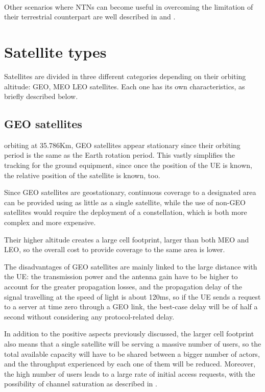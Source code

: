 \paragraph{} Other scenarios where \ac{NTNs} can become useful in overcoming the limitation of their terrestrial counterpart are well described in \cite{ntn-6g-era-challenges-giordani} and \cite{potential-multilayered-nierarchical-ntn-wang}.

\section{Satellite types}
Satellites are divided in three different categories depending on their orbiting altitude: \ac{GEO}, \ac{MEO} \ac{LEO} satellites. Each one has its own characteristics, as briefly described below.
\subsection{\ac{GEO} satellites}
orbiting at 35.786Km, \ac{GEO} satellites appear stationary since their orbiting period is the same as the Earth rotation period. This vastly simplifies the tracking for the ground equipment, since once the position of the \ac{UE} is known, the relative position of the satellite is known, too.
    
Since \ac{GEO} satellites are geostationary, continuous coverage to a designated area can be provided using as little as a single satellite, while the use of non-\ac{GEO} satellites would require the deployment of a constellation, which is both more complex and more expensive.

Their higher altitude creates a large cell footprint, larger than both \ac{MEO} and \ac{LEO}, so the overall cost to provide coverage to the same area is lower.

The disadvantages of \ac{GEO} satellites are mainly linked to the large distance with the \ac{UE}: the transmission power and the antenna gain have to be higher to account for the greater propagation losses, and the propagation delay of the signal travelling at the speed of light is about 120ms, so if the \ac{UE} sends a request to a server at time zero through a \ac{GEO} link, the best-case delay will be of half a second without considering any protocol-related delay.

In addition to the positive aspects previously discussed, the larger cell footprint also means that a single satellite will be serving a massive number of users, so the total available capacity will have to be shared between a bigger number of actors, and the throughput experienced by each one of them will be reduced. 
Moreover, the high number of users leads to a large rate of initial access  requests, with the possibility of channel saturation as described in \cite{3gpp-tr-38.811}.

